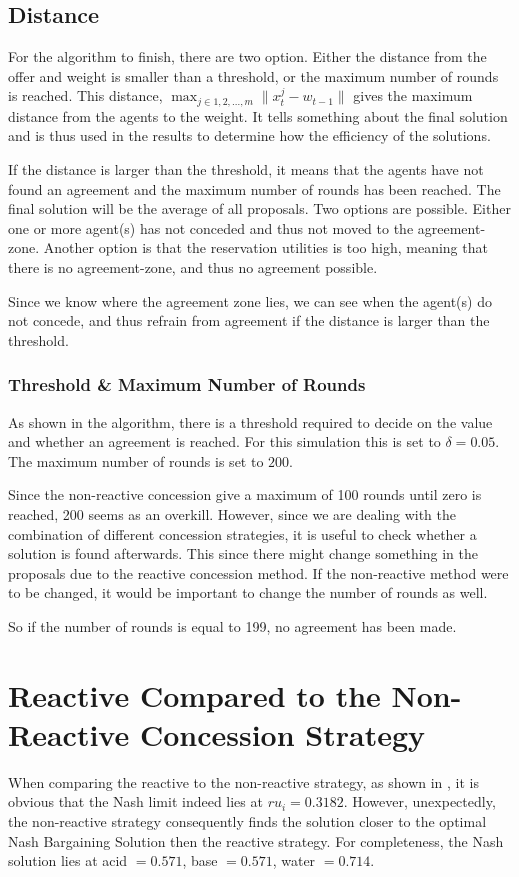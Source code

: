 \subsection{Distance}
For the algorithm  to finish, there are two option. Either the distance from the offer and weight is smaller than a threshold, or the maximum number of rounds is reached. This distance, $ \displaystyle\max_{ j \in {1,2,...,m}} \parallel x^j_t-w_{t-1} \parallel$ gives the maximum distance from the agents to the weight. It tells something about the final solution and is thus used in the results to determine how the efficiency of the solutions. 

If the distance is larger than the threshold, it means that the agents have not found an agreement and the maximum number of rounds has been reached. The final solution will be the average of all proposals. Two options are possible. Either one or more agent(s) has not conceded and thus not moved to the agreement-zone. Another option is that the reservation utilities is too high, meaning that there is no agreement-zone, and thus no agreement possible. 

Since we know where the agreement zone lies, we can see when the agent(s) do not concede, and thus refrain from agreement if the distance is larger than the threshold.


\subsubsection{Threshold \& Maximum Number of Rounds}
As shown in the algorithm, there is a threshold required to decide on the value and whether an agreement is reached. For this simulation this is set to $\delta = 0.05$.	The maximum number of rounds is set to $200$.

Since the non-reactive concession give a maximum of 100 rounds until zero is reached, 200 seems as an overkill. However, since we are dealing with the combination of different concession strategies, it is useful to check whether a solution is found afterwards. This since there might change something in the proposals due to the reactive concession method. If the non-reactive method were to be changed, it would be important to change the number of rounds as well. 

So if the number of rounds is equal to 199, no agreement has been made.

\section{Reactive Compared to the Non-Reactive Concession Strategy}
When comparing the reactive to the non-reactive strategy, as shown in , it is obvious that the Nash limit indeed lies at $ru_i = 0.3182$. However, unexpectedly, the non-reactive strategy consequently finds the solution closer to the optimal Nash Bargaining Solution then the reactive strategy. For completeness, the Nash solution lies at acid $= 0.571$, base $= 0.571$, water $= 0.714$.

